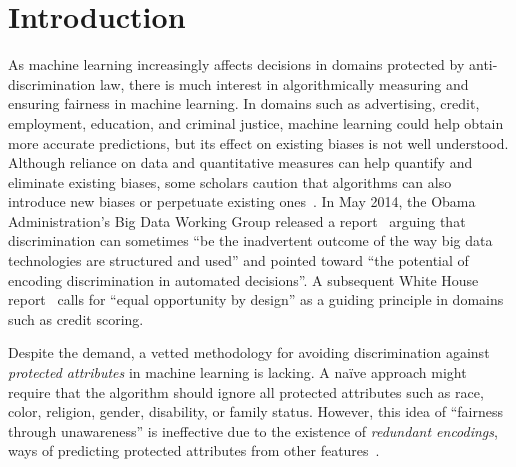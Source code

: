 \section{Introduction}

As machine learning increasingly affects decisions in domains
protected by anti-discrimination law, there is much interest in
algorithmically measuring and ensuring fairness in machine learning.
In domains such as advertising, credit, employment, education, and criminal
justice, machine learning could help obtain more accurate predictions,
but its effect on existing biases is not well understood. Although reliance on
data and quantitative measures can help quantify and eliminate existing biases,
some scholars caution that algorithms can also introduce new biases or
perpetuate existing ones~\cite{BarocasS16}. In May 2014, the Obama
Administration's Big Data Working Group released a report~\cite{Podesta14}
arguing that discrimination can sometimes ``be the inadvertent outcome of the
way big data technologies are structured and used'' and pointed toward ``the
potential of encoding discrimination in automated decisions''. A subsequent
White House report~\cite{WhiteHouse16} calls for ``equal opportunity by design''
as a guiding principle in domains such as credit scoring.

Despite the demand, a vetted methodology for avoiding discrimination against
\emph{protected attributes} in machine learning is lacking. A na\"ive approach might
require that the algorithm should ignore all protected attributes such as
race, color, religion, gender, disability, or family status. However, this idea
of ``fairness through unawareness'' is ineffective due to the existence of
\emph{redundant encodings}, ways of predicting protected attributes from other
features~\cite{PedreshiRT08}.

